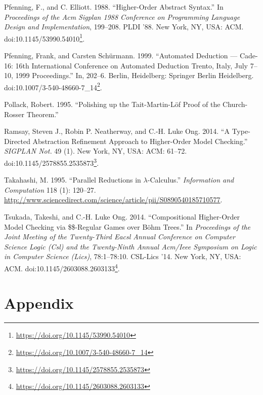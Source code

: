 \documentclass[a4paper, 12pt, twoside]{style/ociamthesis}
\theoremstyle{plain}
\theoremstyle{definition}
\theoremstyle{remark}
\renewcommand{\href}[2]{#2\footnote{\url{#1}}}
\begin{document}
\hypertarget{ref-pfenning88}{}
Pfenning, F., and C. Elliott. 1988. ``Higher-Order Abstract Syntax.'' In
\emph{Proceedings of the Acm Sigplan 1988 Conference on Programming
Language Design and Implementation}, 199--208. PLDI '88. New York, NY,
USA: ACM.
doi:\href{https://doi.org/10.1145/53990.54010}{10.1145/53990.54010}.

\hypertarget{ref-pfenning99}{}
Pfenning, Frank, and Carsten Schürmann. 1999. ``Automated Deduction ---
Cade-16: 16th International Conference on Automated Deduction Trento,
Italy, July 7--10, 1999 Proceedings.'' In, 202--6. Berlin, Heidelberg:
Springer Berlin Heidelberg.
doi:\href{https://doi.org/10.1007/3-540-48660-7_14}{10.1007/3-540-48660-7\_14}.

\hypertarget{ref-pollack95}{}
Pollack, Robert. 1995. ``Polishing up the Tait-Martin-Löf Proof of the
Church-Rosser Theorem.''

\hypertarget{ref-ramsay14}{}
Ramsay, Steven J., Robin P. Neatherway, and C.-H. Luke Ong. 2014. ``A
Type-Directed Abstraction Refinement Approach to Higher-Order Model
Checking.'' \emph{SIGPLAN Not.} 49 (1). New York, NY, USA: ACM: 61--72.
doi:\href{https://doi.org/10.1145/2578855.2535873}{10.1145/2578855.2535873}.

\hypertarget{ref-takahashi95}{}
Takahashi, M. 1995. ``Parallel Reductions in \(\lambda\)-Calculus.''
\emph{Information and Computation} 118 (1): 120--27.
\url{http://www.sciencedirect.com/science/article/pii/S0890540185710577}.

\hypertarget{ref-tsukada14}{}
Tsukada, Takeshi, and C.-H. Luke Ong. 2014. ``Compositional Higher-Order
Model Checking via \$\$-Regular Games over Böhm Trees.'' In
\emph{Proceedings of the Joint Meeting of the Twenty-Third Eacsl Annual
Conference on Computer Science Logic (Csl) and the Twenty-Ninth Annual
Acm/Ieee Symposium on Logic in Computer Science (Lics)}, 78:1--78:10.
CSL-Lics '14. New York, NY, USA: ACM.
doi:\href{https://doi.org/10.1145/2603088.2603133}{10.1145/2603088.2603133}.




\setcounter{secnumdepth}{0}
\chapter*{Appendix}\label{appendix}

\newpage

\newpage
\end{document}
